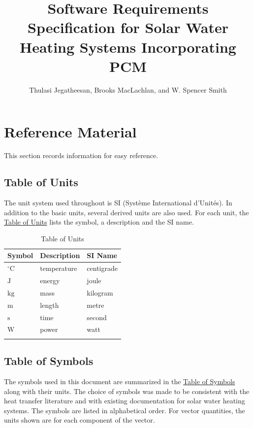 \documentclass[12pt]{article}
\title{Software Requirements Specification for Solar Water Heating Systems Incorporating PCM}
\author{Thulasi Jegatheesan, Brooks MacLachlan, and W. Spencer Smith}
\begin{document}
\maketitle
\tableofcontents
\newpage
\section{Reference Material}
\label{Sec:RefMat}
This section records information for easy reference.

\subsection{Table of Units}
\label{Sec:ToU}
The unit system used throughout is SI (Système International d'Unités). In addition to the basic units, several derived units are also used. For each unit, the \hyperref[Table:ToU]{Table of Units} lists the symbol, a description and the SI name.

\begin{longtable}{l l l}
\toprule
\textbf{Symbol} & \textbf{Description} & \textbf{SI Name}
\\
\midrule
\endhead
${{}^{\circ}\text{C}}$ & temperature & centigrade
\\
${\text{J}}$ & energy & joule
\\
${\text{kg}}$ & mass & kilogram
\\
${\text{m}}$ & length & metre
\\
${\text{s}}$ & time & second
\\
${\text{W}}$ & power & watt
\\
\bottomrule
\caption{Table of Units}
\label{Table:ToU}
\end{longtable}
\subsection{Table of Symbols}
\label{Sec:ToS}
The symbols used in this document are summarized in the \hyperref[Table:ToS]{Table of Symbols} along with their units. The choice of symbols was made to be consistent with the heat transfer literature and with existing documentation for solar water heating systems. The symbols are listed in alphabetical order. For vector quantities, the units shown are for each component of the vector.
\end{document}
